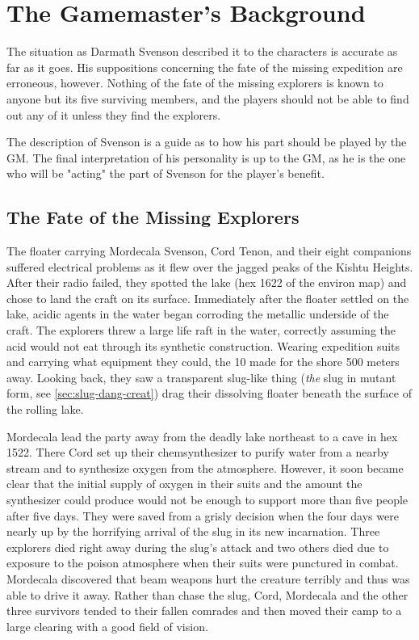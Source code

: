 \section{The Gamemaster's Background}
\label{sec:gm-background}

The situation as Darmath Svenson described it to the characters is
accurate as far as it goes. His suppositions concerning the fate of
the missing expedition are erroneous, however. Nothing of the fate of
the missing explorers is known to anyone but its five surviving
members, and the players should not be able to find out any of it
unless they find the explorers.

The description of Svenson is a guide as to how his part should be
played by the GM. The final interpretation of his personality is up to
the GM, as he is the one who will be "acting" the part of Svenson for
the player's benefit.


\subsection*{The Fate of the Missing Explorers}
\label{sec:fate-miss-expl}

The floater carrying Mordecala Svenson, Cord Tenon, and their eight
companions suffered electrical problems as it flew over the jagged
peaks of the Kishtu Heights. After their radio failed, they spotted
the lake (hex 1622 of the environ map) and chose to land the craft on
its surface. Immediately after the floater settled on the lake, acidic
agents in the water began corroding the metallic underside of the
craft. The explorers threw a large life raft in the water, correctly
assuming the acid would not eat through its synthetic construction.
Wearing expedition suits and carrying what equipment they could, the
10 made for the shore 500 meters away. Looking back, they saw a
transparent slug-like thing (\emph{the} slug in mutant form, see
\ref{sec:slug-dang-creat}) drag their dissolving floater beneath the
surface of the rolling lake.

Mordecala lead the party away from the deadly lake northeast to a cave
in hex 1522. There Cord set up their chemsynthesizer to purify water
from a nearby stream and to synthesize oxygen from the atmosphere.
However, it soon became clear that the initial supply of oxygen in
their suits and the amount the synthesizer could produce would not be
enough to support more than five people after five days. They were
saved from a grisly decision when the four days were nearly up by the
horrifying arrival of the slug in its new incarnation. Three explorers
died right away during the slug's attack and two others died due to
exposure to the poison atmosphere when their suits were punctured in
combat. Mordecala discovered that beam weapons hurt the creature
terribly and thus was able to drive it away. Rather than chase the
slug, Cord, Mordecala and the other three survivors tended to their
fallen comrades and then moved their camp to a large clearing with a
good field of vision.

